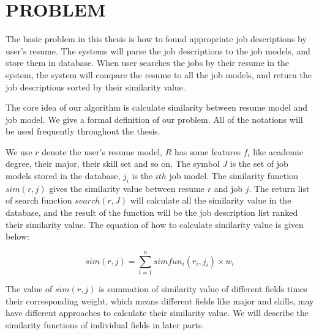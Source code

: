 \chapter{PROBLEM}

The basic problem in this thesis is how to found appropriate job descriptions by user's resume. The systems will parse the job descriptions to the job models, and store them in database. When user searches the jobs by their resume in the system, the system will compare the resume to all the job models, and return the job descriptions sorted by their similarity value. 
   
The core idea of our algorithm is calculate similarity between resume model and job model.  
We give a formal definition of our problem. All of the notations will be used frequently throughout the thesis. 

We use $r$ denote the user's resume model, $R$ has some features $f_i$ like academic degree, their major, their skill set and so on. The symbol $J$ is the set of job models stored in the database, $j_i$ is the $ith$ job model. The similarity function $sim(r, j)$ gives the similarity value between resume $r$ and job $j$. The return list of search function $search(r,J)$ will calculate all the similarity value in the database, and the result of the function will be the job description list ranked their similarity value. The equation of how to calculate similarity value is given below:

$$ sim(r, j) = \sum_{i=1}^{n} simfun_i(r_i,j_i) \times w_i $$

The value of $sim(r, j)$ is summation of similarity value of different fields times their corresponding weight, which means different fields like major and skills,  may have different approaches to calculate their similarity value. We will describe the similarity functions of individual fields in later parts.      


 
